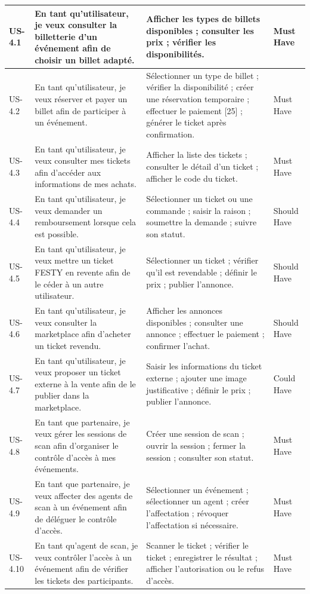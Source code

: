 {\begin{xltabular}{\textwidth}{|>{\centering\arraybackslash}p{1.4cm}|>{\raggedright\arraybackslash}X|>{\raggedright\arraybackslash}X|>{\centering\arraybackslash}p{1.8cm}|}
US-4.1 & En tant qu’utilisateur, je veux consulter la billetterie d’un événement afin de choisir un billet adapté. & Afficher les types de billets disponibles ; consulter les prix ; vérifier les disponibilités. & Must Have \\
\hline
US-4.2 & En tant qu’utilisateur, je veux réserver et payer un billet afin de participer à un événement. & Sélectionner un type de billet ; vérifier la disponibilité ; créer une réservation temporaire ; effectuer le paiement [25] ; générer le ticket après confirmation. & Must Have \\
\hline
US-4.3 & En tant qu’utilisateur, je veux consulter mes tickets afin d’accéder aux informations de mes achats. & Afficher la liste des tickets ; consulter le détail d’un ticket ; afficher le code du ticket. & Must Have \\
\hline
US-4.4 & En tant qu’utilisateur, je veux demander un remboursement lorsque cela est possible. & Sélectionner un ticket ou une commande ; saisir la raison ; soumettre la demande ; suivre son statut. & Should Have \\
\hline
US-4.5 & En tant qu’utilisateur, je veux mettre un ticket FESTY en revente afin de le céder à un autre utilisateur. & Sélectionner un ticket ; vérifier qu’il est revendable ; définir le prix ; publier l’annonce. & Should Have \\
\hline
US-4.6 & En tant qu’utilisateur, je veux consulter la marketplace afin d’acheter un ticket revendu. & Afficher les annonces disponibles ; consulter une annonce ; effectuer le paiement ; confirmer l’achat. & Should Have \\
\hline
US-4.7 & En tant qu’utilisateur, je veux proposer un ticket externe à la vente afin de le publier dans la marketplace. & Saisir les informations du ticket externe ; ajouter une image justificative ; définir le prix ; publier l’annonce. & Could Have \\
\hline
US-4.8 & En tant que partenaire, je veux gérer les sessions de scan afin d’organiser le contrôle d’accès à mes événements. & Créer une session de scan ; ouvrir la session ; fermer la session ; consulter son statut. & Must Have \\
\hline
US-4.9 & En tant que partenaire, je veux affecter des agents de scan à un événement afin de déléguer le contrôle d’accès. & Sélectionner un événement ; sélectionner un agent ; créer l’affectation ; révoquer l’affectation si nécessaire. & Must Have \\
\hline
US-4.10 & En tant qu’agent de scan, je veux contrôler l’accès à un événement afin de vérifier les tickets des participants. & Scanner le ticket ; vérifier le ticket ; enregistrer le résultat ; afficher l’autorisation ou le refus d’accès. & Must Have \\

\end{xltabular}}
